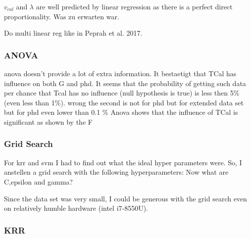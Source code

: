 $v_{cal}$ and $\lambda$ are well predicted by linear regression as there is a perfect direct proportionality. 
Was zu erwarten war. 


Do multi linear reg like in Peprah et al. 2017\cite{peprah2017appraisal}.


\subsubsection{ANOVA}\label{sec:res-anova}
\Gls{anova} doesn't provide a lot of extra information. 
It bestaetigt that TCal has influence on both G and phd. 
It seems that the probability of getting such data per chance that Tcal has no influence 
(null hypothesis is true) is less then 5\% (even less than 1\%). 
wrong the second is not for phd but for extended data set
but for phd even lower than 0.1 \%
Anova shows that the influence of TCal is significant as shown by the F 

\iffalse
\subsubsection{Grid Search}
For \gls{krr} and {svm} I had to find out what the ideal hyper parameters were. 
So, I anstellen a grid search with the following hyperparameters: 
Now what are C,epsilon and gamma? 

Since the data set was very small, I could be generous with the grid search even on relatively humble hardware (intel i7-8550U). 

\subsubsection{KRR}

